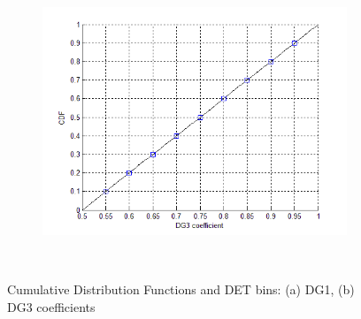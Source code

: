 \begin{figure}
\begin{subfigure}[b]{0.48\textwidth}
                \includegraphics[width=\textwidth]{figures/DG3CoeffDist.png}
                \caption{}
                \label{fig:DG3CoeffDist}
        \end{subfigure}
        ~ %
        \caption{Cumulative Distribution Functions and DET bins: (a) DG1, (b) DG3 coefficients}\label{fig:CDFsDGs}
\end{figure}
